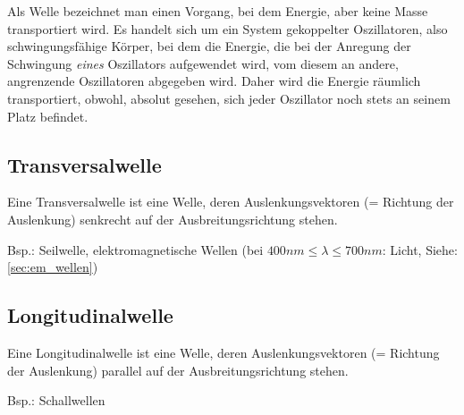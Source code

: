Als Welle bezeichnet man einen Vorgang, bei dem Energie, aber keine Masse transportiert wird. Es handelt sich um ein System gekoppelter Oszillatoren, also schwingungsfähige Körper, bei dem die Energie, die bei der Anregung der Schwingung \emph{eines} Oszillators aufgewendet wird, vom diesem an andere, angrenzende Oszillatoren abgegeben wird. Daher wird die Energie räumlich transportiert, obwohl, absolut gesehen, sich jeder Oszillator noch stets an seinem Platz befindet.

\subsection{Transversalwelle}

Eine Transversalwelle ist eine Welle, deren Auslenkungsvektoren (= Richtung der Auslenkung) senkrecht auf der Ausbreitungsrichtung stehen.

Bsp.: Seilwelle, elektromagnetische Wellen (bei $ 400nm \leq \lambda \leq 700nm $: Licht, Siehe: \ref{sec:em_wellen})

\subsection{Longitudinalwelle}

Eine Longitudinalwelle ist eine Welle, deren Auslenkungsvektoren (= Richtung der Auslenkung) parallel auf der Ausbreitungsrichtung stehen.

Bsp.: Schallwellen